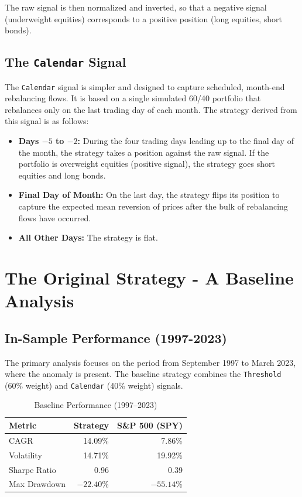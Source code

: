 \documentclass{article}
\begin{document}
The raw signal is then normalized and inverted, so that a negative signal (underweight equities) corresponds to a positive position (long equities, short bonds).

\subsection{The \texttt{Calendar} Signal}
The \texttt{Calendar} signal is simpler and designed to capture scheduled, month-end rebalancing flows. It is based on a single simulated 60/40 portfolio that rebalances only on the last trading day of each month. The strategy derived from this signal is as follows:
\begin{itemize}
    \item \textbf{Days $-5$ to $-2$:} During the four trading days leading up to the final day of the month, the strategy takes a position against the raw signal. If the portfolio is overweight equities (positive signal), the strategy goes short equities and long bonds.
    \item \textbf{Final Day of Month:} On the last day, the strategy flips its position to capture the expected mean reversion of prices after the bulk of rebalancing flows have occurred.
    \item \textbf{All Other Days:} The strategy is flat.
\end{itemize}

\section{The Original Strategy - A Baseline Analysis}

\subsection{In-Sample Performance (1997-2023)}
The primary analysis focuses on the period from September 1997 to March 2023, where the anomaly is present. The baseline strategy combines the \texttt{Threshold} (60\% weight) and \texttt{Calendar} (40\% weight) signals.

\begin{table}[htbp]
\centering
\caption{Baseline Performance (1997--2023)}
\begin{tabular}{lrr}
\toprule
\textbf{Metric} & \textbf{Strategy} & \textbf{S\&P 500 (SPY)} \\
\midrule
CAGR           & 14.09\%   & 7.86\%         \\
Volatility     & 14.71\%   & 19.92\%        \\
Sharpe Ratio   & 0.96     & 0.39          \\
Max Drawdown   & $-22.40$\%  & $-55.14$\%       \\
\bottomrule
\end{tabular}
\end{table}
\end{document}
